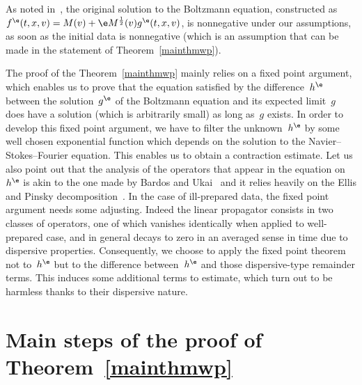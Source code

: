 \begin{rema}
As noted in~\cite{luzhang}, the original solution to the Boltzmann equation, constructed as~$f^\e(t,x,v)= M(v) + \e M^\frac12(v) g^\e(t,x,v)$, is nonnegative under our assumptions, as soon as the initial data is nonnegative (which is an assumption that can be made in the statement of Theorem~\ref{mainthmwp}).
\end{rema}

The proof of the Theorem~\ref{mainthmwp} mainly relies on a fixed point argument, which enables us to prove that the equation satisfied by the difference~$h^\e$ between the solution~$g^\e$ of the Boltzmann equation and its expected limit~$g$ does have a solution (which is arbitrarily small) as long as~$g$ exists. In order to develop this fixed point argument, we have to filter the unknown~$h^\e$ by some well chosen exponential function which depends on the solution to the Navier--Stokes--Fourier equation. This enables us to obtain a contraction estimate. Let us also point out that the analysis of the operators that appear in the equation on~$h^\e$ is akin to the one made by Bardos and Ukai~\cite{Bardos-Ukai} and it relies heavily on the Ellis and Pinsky decomposition~\cite{Ellis-Pinsky}. In the case of ill-prepared data, the fixed point argument needs some adjusting. Indeed the linear propagator consists in two classes of operators, one of which vanishes identically when applied to well-prepared case, and in general decays to zero in an averaged sense in time due to dispersive properties. Consequently, we choose to apply the fixed point theorem not to~$h^\e$ but to the difference between~$h^\e$ and those dispersive-type remainder terms. This induces some additional terms to estimate, which turn out to be harmless thanks to their dispersive nature.



\section{Main steps of the proof of Theorem~\ref{mainthmwp}}
